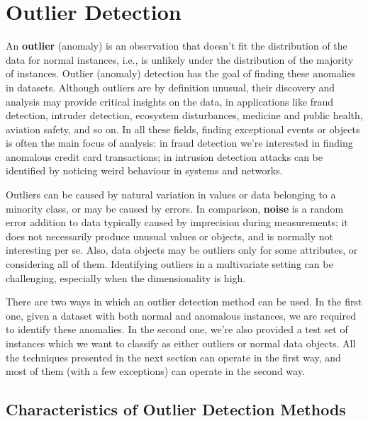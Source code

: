 \chapter{Outlier Detection}

An \textbf{outlier} (anomaly) is an observation that doesn't fit the distribution of the data for normal instances, i.e., is unlikely under the distribution of the majority of instances. Outlier (anomaly) detection has the goal of finding these anomalies in datasets. Although outliers are by definition unusual, their discovery and analysis may provide critical insights on the data, in applications like fraud detection, intruder detection, ecosystem disturbances, medicine and public health, aviation safety, and so on. In all these fields, finding exceptional events or objects is often the main focus of analysis: in fraud detection we're interested in finding anomalous credit card transactions; in intrusion detection attacks can be identified by noticing weird behaviour in systems and networks.

Outliers can be caused by natural variation in values or data belonging to a minority class, or may be caused by errors. In comparison, \textbf{noise} is a random error addition to data typically caused by imprecision during measurements; it does not necessarily produce unusual values or objects, and is normally not interesting per se. Also, data objects may be outliers only for some attributes, or considering all of them. Identifying outliers in a multivariate setting can be challenging, especially when the dimensionality is high.

There are two ways in which an outlier detection method can be used. In the first one, given a dataset with both normal and anomalous instances, we are required to identify these anomalies. In the second one, we're also provided a test set of instances which we want to classify as either outliers or normal data objects. All the techniques presented in the next section can operate in the first way, and most of them (with a few exceptions) can operate in the second way.

\section{Characteristics of Outlier Detection Methods}


